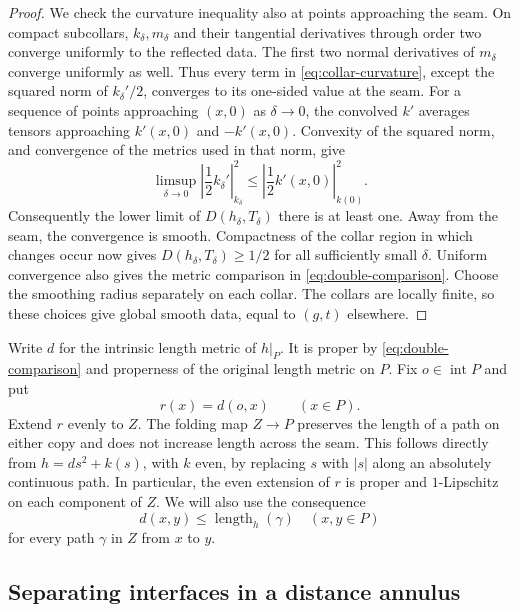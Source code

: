 \begin{proof}
We check the curvature inequality also at points approaching the seam.
On compact subcollars, $k_\delta,m_\delta$ and their tangential derivatives
through order two converge uniformly to the reflected data.  The first
two normal derivatives of $m_\delta$ converge uniformly as well.  Thus
every term in \eqref{eq:collar-curvature}, except the squared norm of
$k_\delta'/2$, converges to its one-sided value at the seam.  For a
sequence of points approaching $(x,0)$ as $\delta\to0$, the convolved
$k'$ averages tensors approaching $k'(x,0)$ and $-k'(x,0)$.  Convexity of
the squared norm, and convergence of the metrics used in that norm,
give
\[
 \limsup_{\delta\to0}
 \left|\frac12k_\delta'\right|_{k_\delta}^2
 \le \left|\frac12k'(x,0)\right|_{k(0)}^2.
\]
Consequently the lower limit of $D(h_\delta,T_\delta)$ there is at least
one.  Away from the seam, the convergence is smooth.  Compactness of
the collar region in which changes occur now gives
$D(h_\delta,T_\delta)\ge1/2$ for all sufficiently small $\delta$.
Uniform convergence also gives the metric comparison in
\eqref{eq:double-comparison}.  Choose the smoothing radius separately
on each collar.  The collars are locally finite, so these choices give
global smooth data, equal to $(g,t)$ elsewhere.
\end{proof}

Write $d$ for the intrinsic length metric of $h|_P$.  It is proper by
\eqref{eq:double-comparison} and properness of the original length metric
on $P$.  Fix $o\in\operatorname{int}P$ and put
\begin{equation}\label{eq:radial-distance}
 r(x)=d(o,x)\qquad(x\in P).
\end{equation}
Extend $r$ evenly to $Z$.  The folding map $Z\to P$ preserves the length
of a path on either copy and does not increase length across the seam.
This follows directly from $h=ds^2+k(s)$, with $k$ even, by replacing
$s$ with $|s|$ along an absolutely continuous path.  In particular, the
even extension of $r$ is proper and $1$-Lipschitz on each component of
$Z$.  We will also use the consequence
\begin{equation}\label{eq:folding-distance}
 d(x,y)\le\operatorname{length}_h(\gamma)
 \quad(x,y\in P)
\end{equation}
for every path $\gamma$ in $Z$ from $x$ to $y$.

\subsection{Separating interfaces in a distance annulus}

